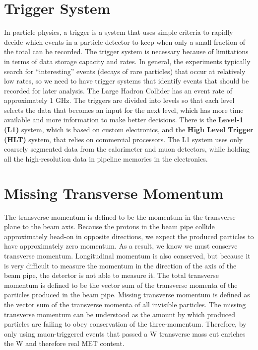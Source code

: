 \section{Trigger System}
In particle physics, a trigger is a system that uses simple criteria to rapidly decide which events in a particle detector to keep when only a small fraction of the total can be recorded.
The trigger system is necessary because of limitations in terms of data storage capacity and rates. 
In general, the experiments typically search for ``interesting'' events (decays of rare particles) that occur at relatively low rates, so we need to have trigger systems that identify events that should be recorded for later analysis. 
The Large Hadron Collider has an event rate of approximately 1 GHz. 
The triggers are divided into levels so that each level selects the data that becomes an input for the next level, which has more time available and more information to make better decisions.
There is the \textbf{Level-1 (L1)} system, which is based on custom electronics, and the \textbf{High Level Trigger (HLT)} system, that relies on commercial processors. 
The L1 system uses only coarsely segmented data from the calorimeter and muon detectors, while holding all the high-resolution data in pipeline memories in the electronics.
\section{Missing Transverse Momentum}
The transverse momentum is defined to be the momentum in the transverse plane to the beam axis. 
Because the protons in the beam pipe collide approximately head-on in opposite directions, we expect the produced particles to have approximately zero momentum. 
As a result, we know we must conserve transverse momentum. Longitudinal momentum is also conserved, but because it is very difficult to measure the momentum in the direction of the axis of the beam pipe, the detector is not able to measure it. 
The total transverse momentum is defined to be the vector sum of the transverse momenta of the particles produced in the beam pipe. 
Missing transverse momentum is defined as the vector sum of the transverse momenta of all invisible particles.
The missing transverse momentum can be understood as the amount by which produced particles are failing to obey conservation of the three-momentum.
Therefore, by only using muon-triggered events that passed a W transverse mass cut enriches the W and therefore real MET content.
